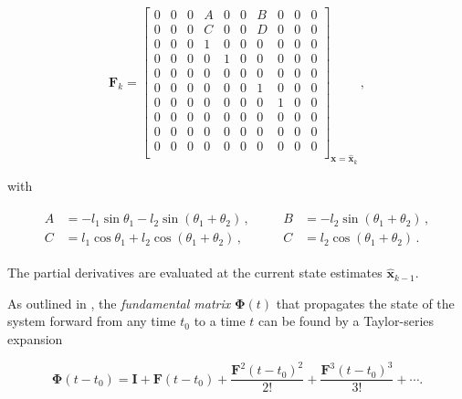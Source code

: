 \begin{equation}
\mathbf{F}_k = \begin{bmatrix}
  0 & 0 & 0 & A & 0 & 0 & B & 0 & 0 & 0\\
  0 & 0 & 0 & C & 0 & 0 & D & 0 & 0 & 0\\
  0 & 0 & 0 & 1 & 0 & 0 & 0 & 0 & 0 & 0\\
  0 & 0 & 0 & 0 & 1 & 0 & 0 & 0 & 0 & 0\\
  0 & 0 & 0 & 0 & 0 & 0 & 0 & 0 & 0 & 0\\
  0 & 0 & 0 & 0 & 0 & 0 & 1 & 0 & 0 & 0\\
  0 & 0 & 0 & 0 & 0 & 0 & 0 & 1 & 0 & 0\\
  0 & 0 & 0 & 0 & 0 & 0 & 0 & 0 & 0 & 0\\
  0 & 0 & 0 & 0 & 0 & 0 & 0 & 0 & 0 & 0\\
  0 & 0 & 0 & 0 & 0 & 0 & 0 & 0 & 0 & 0\\
\end{bmatrix}_{\mathbf{x}=\hat{\mathbf{x}}_{k}}\,,
\end{equation}

\noindent
with

\begin{equation*}
  \begin{array}{cc}
  \begin{split}
  	A &= -l_1 \sin \theta_1 -l_2 \sin (\theta_1 + \theta_2)\,, \quad \\
  	C &=l_1 \cos \theta_1 + l_2 \cos (\theta_1 + \theta_2)\,,
  \end{split} &
  \begin{split}
  B &= -l_2 \sin (\theta_1 + \theta_2)\,, \\
  C &= l_2 \cos (\theta_1 + \theta_2)\,.
  \end{split}
\end{array}
\end{equation*}

\noindent
The partial derivatives are evaluated at the current state estimates $\hat{\mathbf{x}}_{k-1}$.

As outlined in \cite{zarchan2009fundamentals}, the \emph{fundamental matrix} $\bm{\Phi}(t)$ that propagates the state of the system forward from any time $t_0$ to a time $t$ can be found by a Taylor-series expansion 

\begin{equation}
  \bm{\Phi}(t-t_0) = \mathbf{I} + \mathbf{F} (t-t_0) + \frac{\mathbf{F}^2 (t-t_0)^2}{2!} +\frac{\mathbf{F}^{3} (t-t_0)^3}{3!} + \cdots.
\end{equation}
 
